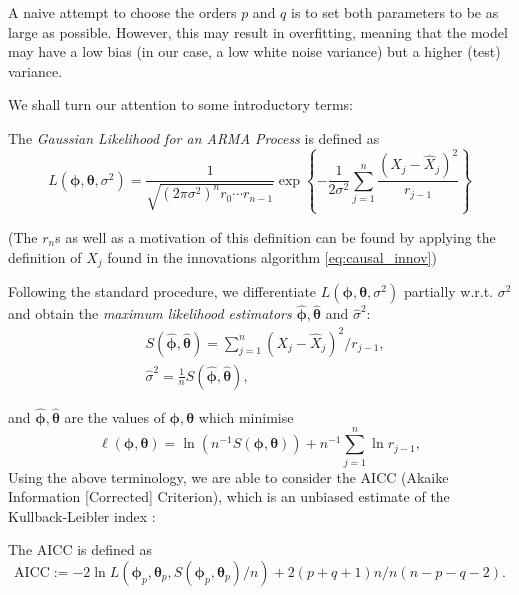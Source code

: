 \documentclass[a4paper, oneside]{discothesis}
\begin{document}
A naive attempt to choose the orders $p$ and $q$ is to set both parameters to be as large as possible. However, this may result in overfitting, meaning that the model may have a low bias (in our case, a low white noise variance) but a higher (test) variance.

We shall turn our attention to some introductory terms:

\begin{definition}
    The \textit{Gaussian Likelihood for an ARMA Process} is defined as
    \begin{equation*}
        L(\boldsymbol{\phi}, \boldsymbol{\theta}, \sigma^2) = \frac{1}{\sqrt{(2\pi \sigma^2)^n r_0 \cdots r_{n-1}}} \exp \left\{-\frac{1}{2\sigma^2} \sum_{j=1}^n \frac{(X_j - \hat{X}_j)^2}{r_{j-1}}\right\}
    \end{equation*}
\end{definition}
(The $r_n$s as well as a motivation of this definition can be found by applying the definition of $\hat{X}_j$ found in the innovations algorithm \eqref{eq:causal_innov})

Following the standard procedure, we differentiate $ L(\boldsymbol{\phi}, \boldsymbol{\theta}, \sigma^2)$ partially w.r.t. $\sigma^2$ and obtain the \textit{maximum likelihood estimators} $\hat{\boldsymbol{\phi}}, \hat{\boldsymbol{\theta}}$ and $\hat{\sigma}^2$:
\begin{align*}
     &S\left(\hat{\boldsymbol{\phi}}, \hat{\boldsymbol{\theta}}\right) = \sum_{j=1}^n \left(X_j - \hat{X}_j\right)^2 / r_{j-1}, \\
     &\hat{\sigma}^2 = \frac{1}{n}S\left(\hat{\boldsymbol{\phi}}, \hat{\boldsymbol{\theta}}\right),
\end{align*}

and $\hat{\boldsymbol{\phi}}, \hat{\boldsymbol{\theta}}$ are the values of $\boldsymbol{\phi}, \boldsymbol{\theta}$ which minimise
\begin{equation*}
     \ell(\boldsymbol{\phi}, \boldsymbol{\theta}) = \ln(n^{-1}  S\left(\boldsymbol{\phi}, \boldsymbol{\theta}\right)) + n^{-1} \sum_{j=1}^n \ln r_{j-1},
\end{equation*}
Using the above terminology, we are able to consider the AICC (Akaike Information [Corrected] Criterion), which is an unbiased estimate of the Kullback-Leibler index :
\begin{definition} The AICC is defined as
    \begin{equation}\label{eq:AICC}
        \mathrm{AICC} := -2 \ln L(\boldsymbol{\phi}_p, \boldsymbol{\theta}_p, S(\boldsymbol{\phi}_p, \boldsymbol{\theta}_p)/n) + 2(p+q+1)n/n(n-p-q-2). 
    \end{equation}
\end{definition}
\end{document}
